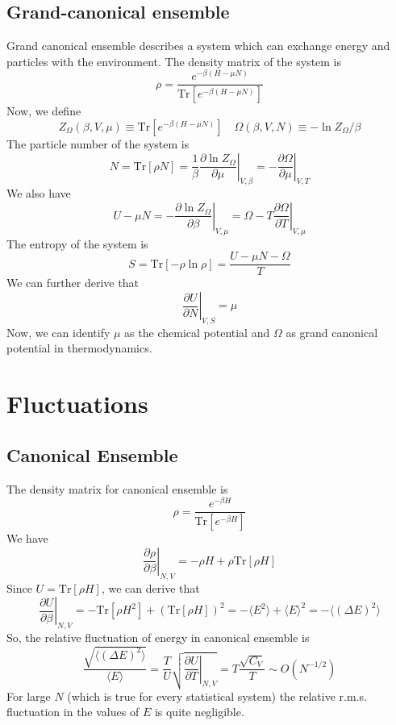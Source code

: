 \subsection{Grand-canonical ensemble}
Grand canonical ensemble describes a system which can exchange energy and particles with the environment. The density matrix of the system is
\[\rho = \frac{e^{-\beta (H - \mu N)}}{\mathrm{Tr}[e^{-\beta (H - \mu N)}]}\]
Now, we define
\[Z_{\Omega}(\beta,V,\mu) \equiv \mathrm{Tr}[e^{-\beta (H-\mu N)}] \quad \Omega(\beta,V,N) \equiv -\ln Z_{\Omega}/\beta\]
The particle number of the system is
\[N = \mathrm{Tr}[\rho N] = \frac{1}{\beta}\left. \frac{\partial \ln Z_{\Omega}}{\partial \mu} \right|_{V,\beta} = -\left. \frac{\partial \Omega}{\partial \mu} \right|_{V,T}\]
We also have
\[U - \mu N = -\left. \frac{\partial \ln Z_{\Omega}}{\partial \beta} \right|_{V,\mu} = \Omega - T\left. \frac{\partial \Omega}{\partial T} \right|_{V,\mu} \]
The entropy of the system is
\[S = \mathrm{Tr}[-\rho\ln\rho] = \frac{U-\mu N - \Omega}{T}\]
We can further derive that
\[\left. \frac{\partial U}{\partial N}\right|_{V,S} = \mu\]
Now, we can identify $\mu$ as the chemical potential and $\Omega$ as grand canonical potential in thermodynamics.

\section{Fluctuations}
\subsection{Canonical Ensemble}
The density matrix for canonical ensemble is
\[\rho = \frac{e^{-\beta H}}{\mathrm{Tr}[e^{-\beta H}]}\]
We have
\[\left. \frac{\partial \rho}{\partial \beta} \right|_{N,V} = -\rho H + \rho \mathrm{Tr}[\rho H]\]
Since $U = \mathrm{Tr}[\rho H]$, we can derive that
\[\left. \frac{\partial U}{\partial \beta} \right|_{N,V} = -\mathrm{Tr}[\rho H^2] + (\mathrm{Tr}[\rho H])^2 = -\langle E^2 \rangle + \langle E \rangle^2 = -\langle (\Delta E)^2 \rangle\]
So, the relative fluctuation of energy in canonical ensemble is
\[\frac{\sqrt{\langle (\Delta E)^2 \rangle}}{\langle E \rangle} = \frac{T}{U}\sqrt{\left. \frac{\partial U}{\partial T} \right|_{N,V}} = T \frac{\sqrt{C_V}}{T} \sim O(N^{-1/2})\]
For large $N$ (which is true for every statistical system) the relative r.m.s. fluctuation in the values of $E$ is quite negligible.


